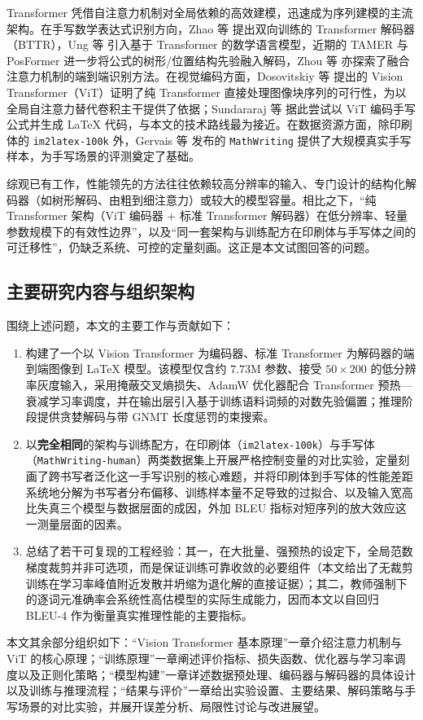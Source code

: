 Transformer\supercite{vaswaniAttentionAllYou2017} 凭借自注意力机制对全局依赖的高效建模，迅速成为序列建模的主流架构。在手写数学表达式识别方向，Zhao 等\supercite{zhaoHandwrittenMathematicalExpression2021} 提出双向训练的 Transformer 解码器（BTTR），Ung 等\supercite{ungTransformerbasedMathLanguage2021} 引入基于 Transformer 的数学语言模型，近期的 TAMER\supercite{zhuTAMERTreeawareTransformer2024} 与 PosFormer\supercite{guanPosFormerRecognizingComplex2024} 进一步将公式的树形/位置结构先验融入解码，Zhou 等\supercite{zhouEndtoendFormulaRecognition2022} 亦探索了融合注意力机制的端到端识别方法。在视觉编码方面，Dosovitskiy 等\supercite{dosovitskiyImageWorth16x162021} 提出的 Vision Transformer（ViT）证明了纯 Transformer 直接处理图像块序列的可行性，为以全局自注意力替代卷积主干提供了依据；Sundararaj 等\supercite{sundararajAutomatedLaTeXCode2024} 据此尝试以 ViT 编码手写公式并生成 LaTeX 代码，与本文的技术路线最为接近。在数据资源方面，除印刷体的 \texttt{im2latex-100k} 外，Gervais 等\supercite{gervaisMathWritingDatasetHandwritten2025} 发布的 \texttt{MathWriting} 提供了大规模真实手写样本，为手写场景的评测奠定了基础。

综观已有工作，性能领先的方法往往依赖较高分辨率的输入、专门设计的结构化解码器（如树形解码、由粗到细注意力）或较大的模型容量。相比之下，“纯 Transformer 架构（ViT 编码器 + 标准 Transformer 解码器）在低分辨率、轻量参数规模下的有效性边界”，以及“同一套架构与训练配方在印刷体与手写体之间的可迁移性”，仍缺乏系统、可控的定量刻画。这正是本文试图回答的问题。

\subsection{主要研究内容与组织架构}

围绕上述问题，本文的主要工作与贡献如下：

\begin{enumerate}[label={（\arabic*）}, leftmargin=2em, labelsep=0.5em, itemsep=0pt]
    \item 构建了一个以 Vision Transformer 为编码器、标准 Transformer 为解码器的端到端图像到 LaTeX 模型。该模型仅含约 $7.73$M 参数、接受 $50\times200$ 的低分辨率灰度输入，采用掩蔽交叉熵损失、AdamW 优化器配合 Transformer 预热—衰减学习率调度，并在输出层引入基于训练语料词频的对数先验偏置；推理阶段提供贪婪解码与带 GNMT 长度惩罚的束搜索。
    \item 以\textbf{完全相同}的架构与训练配方，在印刷体（\texttt{im2latex-100k}）与手写体（\texttt{MathWriting-human}）两类数据集上开展严格控制变量的对比实验，定量刻画了跨书写者泛化这一手写识别的核心难题，并将印刷体到手写体的性能差距系统地分解为书写者分布偏移、训练样本量不足导致的过拟合、以及输入宽高比失真三个模型与数据层面的成因，外加 BLEU 指标对短序列的放大效应这一测量层面的因素。
    \item 总结了若干可复现的工程经验：其一，在大批量、强预热的设定下，全局范数梯度裁剪并非可选项，而是保证训练可靠收敛的必要组件（本文给出了无裁剪训练在学习率峰值附近发散并坍缩为退化解的直接证据）；其二，教师强制下的逐词元准确率会系统性高估模型的实际生成能力，因而本文以自回归 BLEU-4 作为衡量真实推理性能的主要指标。
\end{enumerate}

本文其余部分组织如下：“Vision Transformer 基本原理”一章介绍注意力机制与 ViT 的核心原理；“训练原理”一章阐述评价指标、损失函数、优化器与学习率调度以及正则化策略；“模型构建”一章详述数据预处理、编码器与解码器的具体设计以及训练与推理流程；“结果与评价”一章给出实验设置、主要结果、解码策略与手写场景的对比实验，并展开误差分析、局限性讨论与改进展望。
